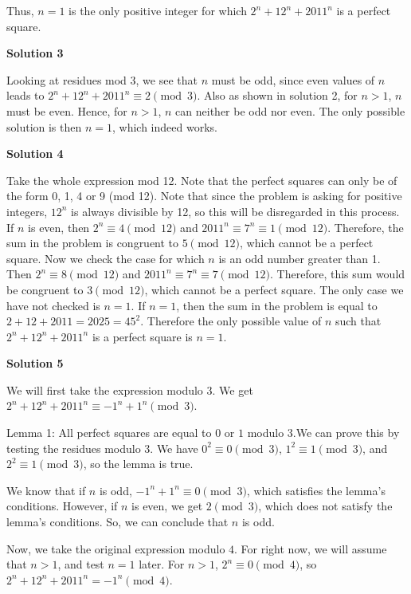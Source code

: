 \begin{enumerate}
 Thus, $n = 1$ is the only positive integer for which $2^n + 12^n + 2011^n$ is a perfect square.

 



\textbf{Solution 3}

Looking at residues mod 3, we see that $n$ must be odd, since even values of $n$ leads to $2^n + 12^n + 2011^n \equiv 2 \pmod{3}$.  Also as shown in solution 2, for $n>1$, $n$ must be even.  Hence, for $n>1$, $n$ can neither be odd nor even.  The only possible solution is then $n=1$, which indeed works.

 



\textbf{Solution 4}

Take the whole expression mod 12. Note that the perfect squares can only be of the form 0, 1, 4 or 9 (mod 12). Note that since the problem is asking for positive integers, $12^n$ is always divisible by 12, so this will be disregarded in this process. If $n$ is even, then $2^n \equiv 4 \pmod{12}$ and $2011^n \equiv 7^n \equiv 1 \pmod {12}$. Therefore, the sum in the problem is congruent to $5 \pmod {12}$, which cannot be a perfect square. Now we check the case for which $n$ is an odd number greater than 1. Then $2^n \equiv 8 \pmod{12}$ and $2011^n \equiv 7^n \equiv 7 \pmod {12}$. Therefore, this sum would be congruent to $3 \pmod {12}$, which cannot be a perfect square. The only case we have not checked is $n=1$. If $n=1$, then the sum in the problem is equal to $2+12+2011=2025=45^2$. Therefore the only possible value of $n$ such that $2^n+12^n+2011^n$ is a perfect square is $n=1$.

 



\textbf{Solution 5}

We will first take the expression modulo $3$. We get $2^n+12^n+2011^n \equiv -1^n+1^n \pmod 3$. 

 Lemma 1: All perfect squares are equal to $0$ or $1$ modulo $3$.We can prove this by testing the residues modulo $3$. We have $0^2 \equiv 0 \pmod 3$, $1^2 \equiv 1 \pmod 3$, and $2^2 \equiv 1 \pmod 3$, so the lemma is true.

 We know that if $n$ is odd, $-1^n+1^n \equiv 0 \pmod 3$, which satisfies the lemma's conditions. However, if $n$ is even, we get $2 \pmod 3$, which does not satisfy the lemma's conditions. So, we can conclude that $n$ is odd.

 Now, we take the original expression modulo $4$. For right now, we will assume that $n>1$, and test $n=1$ later. For $n>1$, $2^n \equiv 0 \pmod 4$, so $2^n+12^n+2011^n=-1^n \pmod 4$.


\end{enumerate}
